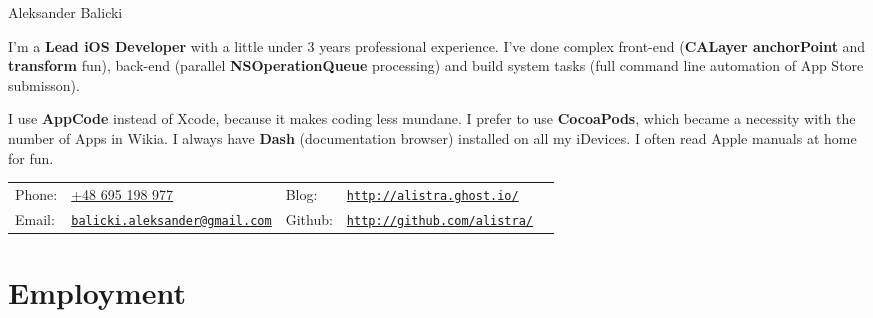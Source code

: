 \documentclass[letterpaper]{article}
\def\name{Aleksander Balicki}
\begin{document}
\centerline{\huge \name}
\vspace{0.25in}

I'm a {\bf Lead iOS Developer} with a little under 3 years professional experience. I've done complex front-end ({\bf CALayer anchorPoint}
 and {\bf transform} fun), back-end (parallel {\bf NSOperationQueue} processing) and build system tasks (full command line automation of App Store submisson). 

I use {\bf AppCode} instead of Xcode, because it makes coding less mundane. I prefer to use {\bf CocoaPods}, which became a necessity with the number of Apps in Wikia. I always have {\bf Dash} (documentation browser) installed on all my iDevices. I often read Apple manuals at home for fun.

\vspace{0.25in}

\begin{tabularx}{\textwidth}{lXlll}
        Phone: 	& \href{tel:+48695198977}{+48 695 198 977} & Blog: & \href{http://alistra.ghost.io/}{\tt http://alistra.ghost.io/} \\
        Email: 	& \href{mailto:balicki.aleksander@gmail.com}{\tt balicki.aleksander@gmail.com}
        & Github: & \href{http://github.com/alistra/}{\tt http://github.com/alistra/}\\
\end{tabularx}

\section*{Employment}
\end{document}
